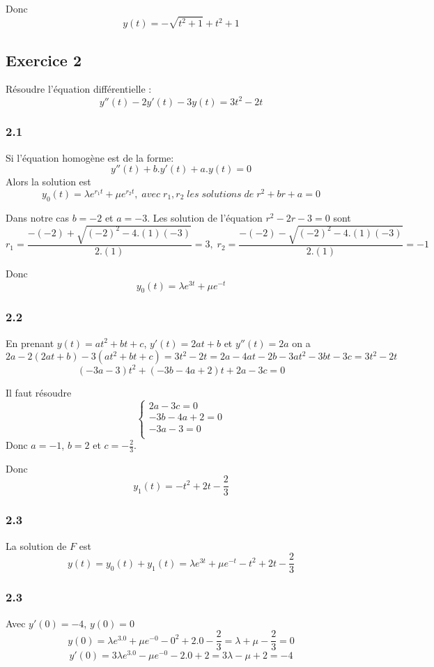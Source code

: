 \documentclass[]{book}
\theoremstyle{definition}
\begin{document}
Donc
$$y(t) = -\sqrt{t^2+1} + t^2+1$$

\subsection*{Exercice 2}
R\'esoudre l'\'equation diff\'erentielle :
$$y''(t) - 2y'(t) -3y(t)= 3t^2 - 2t$$

\subsubsection*{2.1}
Si l'\'equation homog\`ene est de la forme:
$$y''(t) +b.y'(t) + a.y(t) = 0$$
Alors la solution est
$$y_0(t) = \lambda e^{r_1 t} + \mu e^{r_2 t},\; avec\; r_1, r_2\; les\; solutions\; de\; r^2 + br + a = 0$$

Dans notre cas $b = -2$ et $a = -3$. Les solution de l'\'equation $r^2 - 2r - 3 = 0$ sont
$$r_1 = \frac{-(-2)+\sqrt{(-2)^2-4.(1)(-3)}}{2.(1)} = 3,\; r_2 = \frac{-(-2)-\sqrt{(-2)^2-4.(1)(-3)}}{2.(1)} = -1$$

Donc
$$y_0(t) = \lambda e^{3t} + \mu e^{-t}$$

\subsubsection*{2.2}
En prenant $y(t) = at^2 + bt + c$, $y'(t) = 2at+b$ et $y''(t) = 2a$ on a
$$2a - 2(2at+b) -3(at^2+bt+c) = 3t^2 - 2t = 2a -4at -2b -3at^2 -3bt -3c = 3t^2 - 2t$$
$$(-3a - 3)t^2 + (-3b -4a +2)t + 2a - 3c = 0$$

Il faut r\'esoudre
$$
\left\{ 
\begin{array}{l}
 2a - 3c = 0\\
 -3b -4a + 2 = 0\\
 -3a - 3 = 0\\
\end{array}
\right. 
$$
Donc $a=-1$, $b=2$ et $c=-\frac{2}{3}$.

Donc 
$$y_1(t) = -t^2 + 2t -\frac{2}{3}$$

\subsubsection*{2.3}
La solution de $F$ est
$$y(t) = y_0(t) + y_1(t) = \lambda e^{3t} + \mu e^{-t} -t^2 + 2t -\frac{2}{3}$$

\subsubsection*{2.3}
Avec $y'(0) = -4$, $y(0) = 0$
$$y(0) = \lambda e^{3.0} + \mu e^{-0} -0^2 + 2.0 -\frac{2}{3} = \lambda + \mu - \frac{2}{3} = 0$$
$$y'(0) = 3\lambda e^{3.0} - \mu e^{-0} -2.0 + 2 = 3\lambda - \mu + 2 = -4$$
\end{document}
